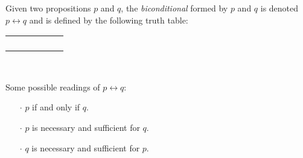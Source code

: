 \begin{definition}[Biconditional]
    \begin{center}
        \begin{minipage}[t]{.55\linewidth}
            Given two propositions $p$ and $q$, the \emph{biconditional} formed by $p$ and $q$
            is denoted $p \leftrightarrow q$ and is defined by the following truth table:
            \begin{table}[H]
                \centering
                \label{tab:iff}
                \begin{tabular}{|CcCc||Cc|}
                    \hline
                     &  &  \\ \hline
                    \thead{$\top$} & \thead{$\top$} &  \\
                    \thead{$\top$} & \thead{$\bot$} &  \\
                    \thead{$\bot$} & \thead{$\top$} &  \\
                    \thead{$\bot$} & \thead{$\bot$} &  \\ \hline
                \end{tabular}
            \end{table}
        \end{minipage}%
        \begin{minipage}[t]{.05\linewidth}
            ~
        \end{minipage}%
        \begin{minipage}[t]{.4\linewidth}
            Some possible readings of $p \leftrightarrow q$:\\
            \begin{itemize}
                \item[$\cdot$]
                    $p$ if and only if $q$.
                \item[$\cdot$]
                    $p$ is necessary and sufficient for $q$.
                \item[$\cdot$]
                    $q$ is necessary and sufficient for $p$.
            \end{itemize}
        \end{minipage}
    \end{center}
\end{definition}

